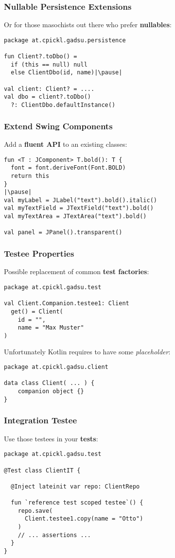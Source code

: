 \begin{frame}[fragile] \frametitle{Nullable Persistence Extensions}
Or for those masochists out there who prefer \textbf{nullables}:
\begin{lstlisting}
package at.cpickl.gadsu.persistence

fun Client?.toDbo() = 
  if (this == null) null 
  else ClientDbo(id, name)|\pause|

val client: Client? = ....
val dbo = client?.toDbo()
  ?: ClientDbo.defaultInstance()
\end{lstlisting}
\end{frame}



\begin{frame}[fragile] \frametitle{Extend Swing Components}
Add a \textbf{fluent API} to an existing classes:
\begin{lstlisting}
fun <T : JComponent> T.bold(): T {
  font = font.deriveFont(Font.BOLD)
  return this
}
|\pause|
val myLabel = JLabel("text").bold().italic()
val myTextField = JTextField("text").bold()
val myTextArea = JTextArea("text").bold()

val panel = JPanel().transparent()
\end{lstlisting}
\end{frame}



\begin{frame}[fragile] \frametitle{Testee Properties}
Possible replacement of common \textbf{test factories}:
\begin{lstlisting}
package at.cpickl.gadsu.test

val Client.Companion.testee1: Client
  get() = Client(
    id = "",
    name = "Max Muster"
)
\end{lstlisting}
\pause

Unfortunately Kotlin requires to have some \textit{placeholder}:
\begin{lstlisting}
package at.cpickl.gadsu.client

data class Client( ... ) {
    companion object {}
}
\end{lstlisting}
\end{frame}

\begin{frame}[fragile] \frametitle{Integration Testee}
Use those testees in your \textbf{tests}:
\begin{lstlisting}
package at.cpickl.gadsu.test

@Test class ClientIT {

  @Inject lateinit var repo: ClientRepo
  
  fun `reference test scoped testee`() {
    repo.save(
      Client.testee1.copy(name = "Otto")
    )
    // ... assertions ... 
  }
}
\end{lstlisting}
\end{frame}

